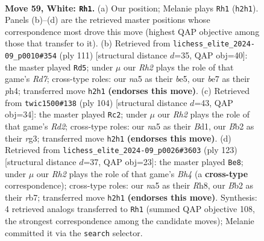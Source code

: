 \documentclass[11pt]{article}
\begin{document}
\clearpage

\begin{figure}[p]\centering
\begin{subfigure}{0.46\textwidth}\centering
\resizebox{\linewidth}{!}{%
\newchessgame
\chessboard[
  setfen={3r4/4b2p/p2p2k1/n3p2p/2P1P3/5P2/1B2K1BR/8 w - - 0 59},
  showmover=false,
  pgfstyle=straightmove, color=movearrow, markmove={h2-h1}
]}
\caption{}
\end{subfigure}\hfill
\begin{subfigure}{0.46\textwidth}\centering
\resizebox{\linewidth}{!}{%
\newchessgame
\chessboard[
  setfen={8/1p3kp1/8/1bP1B2p/p6P/P4PK1/1P1r2P1/2R5 b - - 47 56},
  showmover=false,
  pgfstyle=straightmove, color=movearrow, markmove={d2-d5}
]}
\caption{}
\end{subfigure}
\\[4pt]
\begin{subfigure}{0.46\textwidth}\centering
\resizebox{\linewidth}{!}{%
\newchessgame
\chessboard[
  setfen={8/8/1p4p1/p2pk2p/P3p2P/1P4r1/3R4/3B1K2 w - - 0 53},
  showmover=false,
  pgfstyle=straightmove, color=movearrow, markmove={d2-c2}
]}
\caption{}
\end{subfigure}\hfill
\begin{subfigure}{0.46\textwidth}\centering
\resizebox{\linewidth}{!}{%
\newchessgame
\chessboard[
  setfen={7r/1R5P/7k/4P1pb/1p2B3/pP3PK1/P7/8 b - - 4 62},
  showmover=false,
  pgfstyle=straightmove, color=movearrow, markmove={h5-e8}
]}
\caption{}
\end{subfigure}
\caption{\textbf{Move 59, White: \texttt{Rh1}.} (a) Our position; Melanie plays \texttt{Rh1} (\texttt{h2h1}). Panels (b)--(d) are the retrieved master positions whose correspondence most drove this move (highest QAP objective among those that transfer to it). (b) Retrieved from \texttt{lichess\_elite\_2024-09\_p0010\#354} (ply 111) [structural distance $d$=35, QAP obj=40]: the master played \texttt{Rd5}; under $\mu$ our \emph{Rh2} plays the role of that game's \emph{Rd7}; cross-type roles: our \emph{n}a5 as their \emph{b}e5, our \emph{b}e7 as their \emph{p}h4; transferred move \texttt{h2h1} \textbf{(endorses this move)}. (c) Retrieved from \texttt{twic1500\#138} (ply 104) [structural distance $d$=43, QAP obj=34]: the master played \texttt{Rc2}; under $\mu$ our \emph{Rh2} plays the role of that game's \emph{Rd2}; cross-type roles: our \emph{n}a5 as their \emph{B}d1, our \emph{B}b2 as their \emph{r}g3; transferred move \texttt{h2h1} \textbf{(endorses this move)}. (d) Retrieved from \texttt{lichess\_elite\_2024-09\_p0026\#3603} (ply 123) [structural distance $d$=37, QAP obj=23]: the master played \texttt{Be8}; under $\mu$ our \emph{Rh2} plays the role of that game's \emph{Bh4} (a \textbf{cross-type} correspondence); cross-type roles: our \emph{n}a5 as their \emph{R}h8, our \emph{B}b2 as their \emph{r}b7; transferred move \texttt{h2h1} \textbf{(endorses this move)}. Synthesis: 4 retrieved analogs transferred to \texttt{Rh1} (summed QAP objective 108, the strongest correspondence among the candidate moves); Melanie committed it via the \texttt{search} selector.}
\label{fig:thought-m116}
\end{figure}
\end{document}
